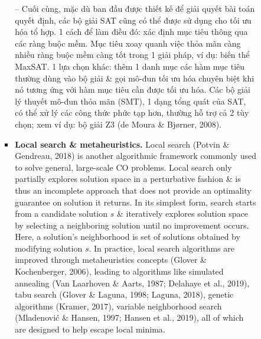 \documentclass{article}
\begin{document}
\begin{itemize}
\begin{itemize}
\begin{itemize}
\begin{itemize}
                -- Cuối cùng, mặc dù ban đầu được thiết kế để giải quyết bài toán quyết định, các bộ giải SAT cũng có thể được sử dụng cho tối ưu hóa tổ hợp. 1 cách để làm điều đó: xác định mục tiêu thông qua các ràng buộc mềm. Mục tiêu xoay quanh việc thỏa mãn càng nhiều ràng buộc mềm càng tốt trong 1 giải pháp, ví dụ: biến thể MaxSAT. 1 lựa chọn khác: thêm 1 danh mục các hàm mục tiêu thường dùng vào bộ giải \& gọi mô-đun tối ưu hóa chuyên biệt khi nó tương ứng với hàm mục tiêu cần được tối ưu hóa. Các bộ giải lý thuyết mô-đun thỏa mãn (SMT), 1 dạng tổng quát của SAT, có thể xử lý các công thức phức tạp hơn, thường hỗ trợ cả 2 tùy chọn; xem ví dụ: bộ giải Z3 (de Moura \& Bjørner, 2008).
                \item {\bf Local search \& metaheuristics.} Local search (Potvin \& Gendreau, 2018) is another algorithmic framework commonly used to solve general, large-scale CO problems. Local search only partially explores solution space in a perturbative fashion \& is thus an incomplete approach that does not provide an optimality guarantee on solution it returns. In its simplest form, search starts from a candidate solution $s$ \& iteratively explores solution space by selecting a neighboring solution until no improvement occurs. Here, a solution's neighborhood is set of solutions obtained by modifying solution $s$. In practice, local search algorithms are improved through metaheuristics concepts (Glover \& Kochenberger, 2006), leading to algorithms like simulated annealing (Van Laarhoven \& Aarts, 1987; Delahaye et al., 2019), tabu search (Glover \& Laguna, 1998; Laguna, 2018), genetic algorithms (Kramer, 2017), variable neighborhood search (Mladenović \& Hansen, 1997; Hansen et al., 2019), all of which are designed to help escape local minima.


\end{itemize}
\end{itemize}
\end{itemize}
\end{itemize}
\end{document}

